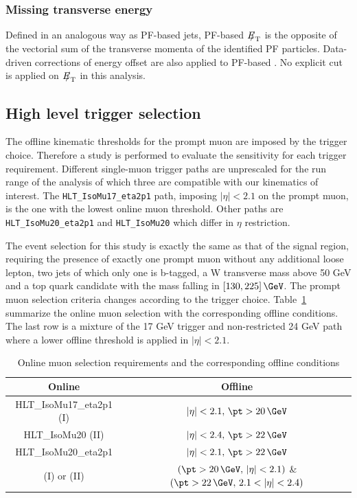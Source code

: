 \subsubsection{Missing transverse energy}

Defined in an analogous way as PF-based jets, PF-based ${E\!\!\!/}_{\mathrm{T}}$ is the opposite of the vectorial sum of the transverse momenta of the identified PF particles. Data-driven corrections of energy offset are also applied to PF-based \MET. No explicit cut is applied on ${E\!\!\!/}_{\mathrm{T}}$ in this analysis.


\subsection{High level trigger selection}
\label{subsec:hlt}
The offline kinematic thresholds for the prompt muon are imposed by the trigger choice. Therefore a study is performed to evaluate the sensitivity for each trigger requirement. Different single-muon trigger paths are unprescaled for the run range of the analysis of which three are compatible with our kinematics of interest. The \verb+HLT_IsoMu17_eta2p1+ path, imposing $|\eta|<2.1$ on the prompt muon, is the one with the lowest online muon \pt threshold. Other paths are \verb+HLT_IsoMu20_eta2p1+ and \verb+HLT_IsoMu20+ which differ in $\eta$ restriction.

The event selection for this study is exactly the same as that of the signal region, requiring the presence of exactly one prompt muon without any additional loose lepton, two jets of which only one is b-tagged, a W transverse mass above 50 GeV and a top quark candidate with the mass falling in $[130,225]\,\GeV$. The prompt muon selection criteria changes according to the trigger choice. Table~\ref{tab:trigMuSel} summarize the online muon selection with the corresponding offline conditions. The last row is a mixture of the 17 GeV trigger and non-restricted 24 GeV path where a lower offline \pt threshold is applied in $|\eta|<2.1$.

 \begin{table}[t!] 
 \caption{Online muon selection requirements and the corresponding offline conditions}
  \label{tab:trigMuSel}
 \begin{center}
\begin{tabular}{|c|c|}
\hline
Online 	& Offline\\
\hline
\small{HLT\_IsoMu17\_eta2p1 (I)}	& $|\eta|<2.1 ,\, \pt>20\,\GeV$	\\
\small{HLT\_IsoMu20 (II)}			& $|\eta|<2.4 ,\, \pt>22\,\GeV$	\\
\small{HLT\_IsoMu20\_eta2p1} 		& $|\eta|<2.1 ,\, \pt>22\,\GeV$ \\
\small{(I) or (II)}					& $(\pt>20\,\GeV,\,|\eta|<2.1)$ \& $(\pt>22\,\GeV,\,2.1<|\eta|<2.4)$\\
\hline
\end{tabular}
\end{center}
\end{table}

